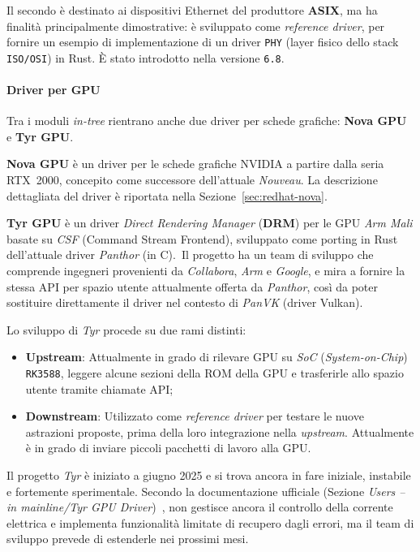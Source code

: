 Il secondo è destinato ai dispositivi Ethernet del produttore \textbf{ASIX}, ma ha finalità principalmente dimostrative:
è sviluppato come \textit{reference driver}, per fornire un esempio di implementazione di un driver \texttt{PHY} (layer fisico dello stack \texttt{ISO/OSI}) in Rust.
È stato introdotto nella versione \texttt{6.8}.

\paragraph{Driver per GPU}
Tra i moduli \textit{in-tree} rientrano anche due driver per schede grafiche: \textbf{Nova GPU} e \textbf{Tyr GPU}.\ 

\textbf{Nova GPU} è un driver per le schede grafiche NVIDIA a partire dalla seria RTX~2000, concepito come successore dell'attuale \textit{Nouveau}.
La descrizione dettagliata del driver è riportata nella Sezione~\ref{sec:redhat-nova}.

\textbf{Tyr GPU} è un driver \textit{Direct Rendering Manager} (\textbf{DRM}) per le GPU \textit{Arm Mali} basate su \textit{CSF} (Command Stream Frontend), 
sviluppato come porting in Rust dell'attuale driver \textit{Panthor} (in C).\ 
Il progetto ha un team di sviluppo che comprende ingegneri provenienti da \textit{Collabora}, \textit{Arm} e \textit{Google}, e mira a fornire la 
stessa API per spazio utente attualmente offerta da \textit{Panthor}, così da poter sostituire direttamente il driver nel contesto di \textit{PanVK} (driver Vulkan).

\noindent Lo sviluppo di \textit{Tyr} procede su due rami distinti:
\begin{itemize}
    \item \textbf{Upstream}: Attualmente in grado di rilevare GPU su \textit{SoC} (\textit{System-on-Chip}) \texttt{RK3588}, leggere alcune sezioni della ROM della GPU e trasferirle allo spazio utente tramite chiamate API;\ 
    \item \textbf{Downstream}: Utilizzato come \textit{reference driver} per testare le nuove astrazioni proposte, prima della loro integrazione nella \textit{upstream}. Attualmente è in grado di inviare piccoli pacchetti di lavoro alla GPU.\ 
\end{itemize}
Il progetto \textit{Tyr} è iniziato a giugno 2025 e si trova ancora in fare iniziale, instabile e fortemente sperimentale.
Secondo la documentazione ufficiale (Sezione \textit{Users -- in mainline/Tyr GPU Driver})~\cite{rust-for-linux}, non gestisce ancora il controllo della corrente elettrica e implementa funzionalità limitate di recupero dagli errori, 
ma il team di sviluppo prevede di estenderle nei prossimi mesi.


